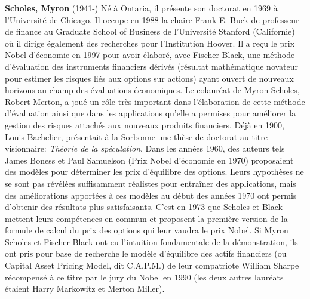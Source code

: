 \textbf{Scholes, Myron} (1941-) Né à Ontaria, il présente son doctorat en 1969 à l'Université de Chicago. Il occupe en 1988 la chaire Frank E. Buck de professeur de finance au Graduate School of Business de l'Université Stanford (Californie) où il dirige également des recherches pour l'Institution Hoover. Il a reçu le prix Nobel d'économie en 1997 pour avoir élaboré, avec Fischer Black, une méthode d'évaluation des instruments financiers dérivés (résultat mathématique novateur pour estimer les risques liés aux options sur actions) ayant ouvert de nouveaux horizons au champ des évaluations économiques. Le colauréat de Myron Scholes, Robert Merton, a joué un rôle très important dans l'élaboration de cette méthode d'évaluation ainsi que dans les applications qu'elle a permises pour améliorer la gestion des risques attachés aux nouveaux produits financiers. Déjà en 1900, Louis Bachelier, présentait à la Sorbonne une thèse de doctorat au titre visionnaire: \textit{Théorie de la spéculation}. Dans les années 1960, des auteurs tels James Boness et Paul Samuelson (Prix Nobel d'économie en 1970) proposaient des modèles pour déterminer les prix d'équilibre des options. Leurs hypothèses ne se sont pas révélées suffisamment réalistes pour entraîner des applications, mais des améliorations apportées à ces modèles au début des années 1970 ont permis d'obtenir des résultats plus satisfaisants. C'est en 1973 que Scholes et Black mettent leurs compétences en commun et proposent la première version de la formule de calcul du prix des options qui leur vaudra le prix Nobel. Si Myron Scholes et Fischer Black ont eu l'intuition fondamentale de la démonstration, ils ont pris pour base de recherche le modèle d'équilibre des actifs financiers (ou Capital Asset Pricing Model, dit C.A.P.M.) de leur compatriote William Sharpe récompensé à ce titre par le jury du Nobel en 1990 (les deux autres lauréats étaient Harry Markowitz et Merton Miller).

